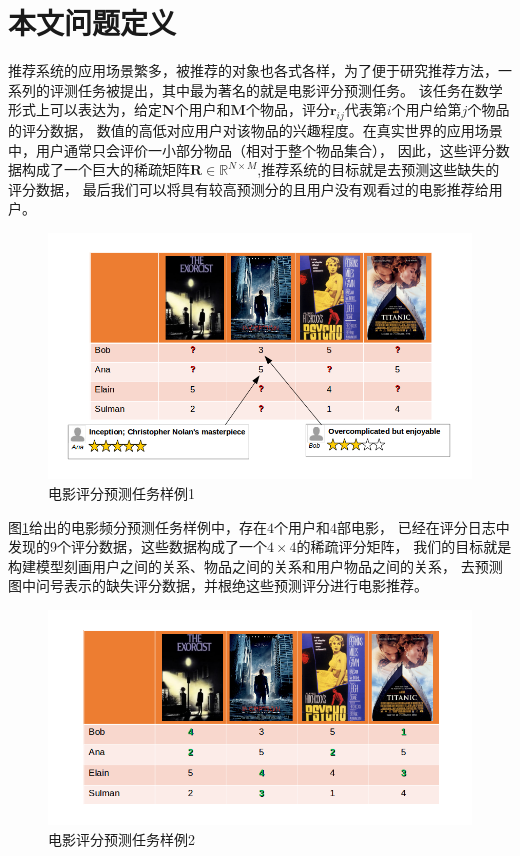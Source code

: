 \section{本文问题定义}
推荐系统的应用场景繁多，被推荐的对象也各式各样，为了便于研究推荐方法，一系列的评测任务被提出，其中最为著名的就是电影评分预测任务。
该任务在数学形式上可以表达为，给定$\mathbf{N}$个用户和$\mathbf{M}$个物品，评分$\mathbf{r}_{ij}$代表第$i$个用户给第$j$个物品的评分数据，
数值的高低对应用户对该物品的兴趣程度。在真实世界的应用场景中，用户通常只会评价一小部分物品（相对于整个物品集合），
因此，这些评分数据构成了一个巨大的稀疏矩阵$\mathbf{R} \in \mathbb{R}^{N \times M}$,推荐系统的目标就是去预测这些缺失的评分数据，
最后我们可以将具有较高预测分的且用户没有观看过的电影推荐给用户。

\begin{figure}[htbp]
\centering
\includegraphics[scale=0.6]{images/task1.png}
\caption{电影评分预测任务样例1}
\label{fig:task1}
\end{figure}

图\ref{fig:task1}给出的电影频分预测任务样例中，存在$4$个用户和$4$部电影，
已经在评分日志中发现的9个评分数据，这些数据构成了一个$4 \times 4$的稀疏评分矩阵，
我们的目标就是构建模型刻画用户之间的关系、物品之间的关系和用户物品之间的关系，
去预测图中问号表示的缺失评分数据，并根绝这些预测评分进行电影推荐。

\begin{figure}[htbp]
\centering
\includegraphics[scale=0.6]{images/task2.png}
\caption{电影评分预测任务样例2}
\label{fig:task2}
\end{figure}

